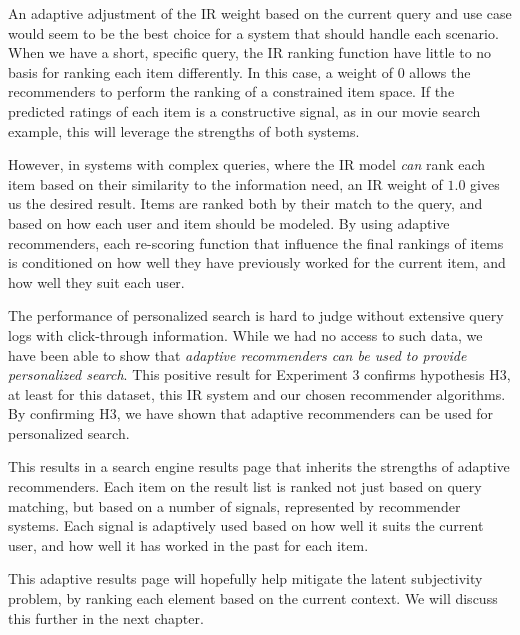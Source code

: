 An adaptive adjustment of the IR weight based on the current query and use case
would seem to be the best choice for a system that should handle each scenario.
When we have a short, specific query, the IR ranking function have little to
no basis for ranking each item differently.
In this case, a weight of $0$ allows the recommenders to perform the ranking
of a constrained item space.
If the predicted ratings of each item is a constructive signal,
as in our movie search example, this will leverage the strengths of both systems.

However, in systems with complex queries, where the IR model
\emph{can} rank each item based on their similarity to the information need,
an IR weight of $1.0$ gives us the desired result.
Items are ranked both by their match to the query,
and based on how each user and item should be modeled.
By using adaptive recommenders, each re-scoring function
that influence the final rankings of items is conditioned
on how well they have previously worked for the current item,
and how well they suit each user.

The performance of personalized search is hard to judge without
extensive query logs with click-through information.
While we had no access to such data, 
we have been able to show that \emph{adaptive recommenders
can be used to provide personalized search}.
This positive result for Experiment 3 confirms hypothesis H3,
at least for this dataset, this IR system and our chosen recommender algorithms.
By confirming H3, we have shown that adaptive recommenders can be used for personalized search.

This results in a search engine results page that inherits the strengths of adaptive recommenders.
Each item on the result list is ranked not just based on query matching,
but based on a number of signals, represented by recommender systems.
Each signal is adaptively used based on how well it suits the current user,
and how well it has worked in the past for each item.

This adaptive results page will hopefully help mitigate the latent subjectivity problem,
by ranking each element based on the current context.
We will discuss this further in the next chapter.


